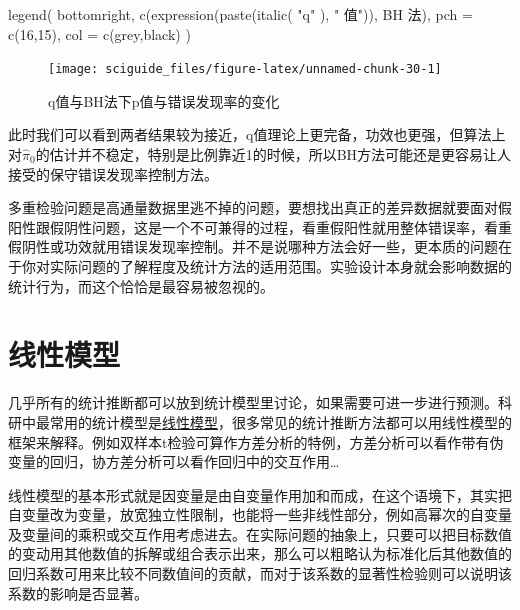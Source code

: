 \documentclass[]{tufte-book}
\newenvironment{Shaded}{}{}
\newcommand{\AttributeTok}[1]{\textcolor[rgb]{0.49,0.56,0.16}{#1}}
\newcommand{\DecValTok}[1]{\textcolor[rgb]{0.25,0.63,0.44}{#1}}
\newcommand{\FunctionTok}[1]{\textcolor[rgb]{0.02,0.16,0.49}{#1}}
\newcommand{\NormalTok}[1]{#1}
\newcommand{\StringTok}[1]{\textcolor[rgb]{0.25,0.44,0.63}{#1}}
\begin{document}
\begin{Shaded}
\begin{Highlighting}[]
\FunctionTok{legend}\NormalTok{(}
  \StringTok{\textquotesingle{}bottomright\textquotesingle{}}\NormalTok{,}
  \FunctionTok{c}\NormalTok{(}\FunctionTok{expression}\NormalTok{(}\FunctionTok{paste}\NormalTok{(}\FunctionTok{italic}\NormalTok{(}
    \StringTok{"q"}
\NormalTok{  ), }\StringTok{" 值"}\NormalTok{)), }\StringTok{\textquotesingle{}BH 法\textquotesingle{}}\NormalTok{),}
  \AttributeTok{pch =} \FunctionTok{c}\NormalTok{(}\DecValTok{16}\NormalTok{,}\DecValTok{15}\NormalTok{),}
  \AttributeTok{col =} \FunctionTok{c}\NormalTok{(}\StringTok{\textquotesingle{}grey\textquotesingle{}}\NormalTok{,}\StringTok{\textquotesingle{}black\textquotesingle{}}\NormalTok{)}
\NormalTok{)}
\end{Highlighting}
\end{Shaded}

\begin{figure}
\texttt{[image: sciguide\_files/figure-latex/unnamed-chunk-30-1]} \caption[q值与BH法下p值与错误发现率的变化]{q值与BH法下p值与错误发现率的变化}\label{fig:unnamed-chunk-30}
\end{figure}

此时我们可以看到两者结果较为接近，q值理论上更完备，功效也更强，但算法上对\(\hat\pi_0\)的估计并不稳定，特别是比例靠近1的时候，所以BH方法可能还是更容易让人接受的保守错误发现率控制方法。

多重检验问题是高通量数据里逃不掉的问题，要想找出真正的差异数据就要面对假阳性跟假阴性问题，这是一个不可兼得的过程，看重假阳性就用整体错误率，看重假阴性或功效就用错误发现率控制。并不是说哪种方法会好一些，更本质的问题在于你对实际问题的了解程度及统计方法的适用范围。实验设计本身就会影响数据的统计行为，而这个恰恰是最容易被忽视的。

\hypertarget{ux7ebfux6027ux6a21ux578b}{%
\section{线性模型}\label{ux7ebfux6027ux6a21ux578b}}

几乎所有的统计推断都可以放到统计模型里讨论，如果需要可进一步进行预测。科研中最常用的统计模型是\href{https://cosx.org/2019/09/common-tests-as-linear-models/}{线性模型}，很多常见的统计推断方法都可以用线性模型的框架来解释。例如双样本t检验可算作方差分析的特例，方差分析可以看作带有伪变量的回归，协方差分析可以看作回归中的交互作用\ldots{}

线性模型的基本形式就是因变量是由自变量作用加和而成，在这个语境下，其实把自变量改为变量，放宽独立性限制，也能将一些非线性部分，例如高幂次的自变量及变量间的乘积或交互作用考虑进去。在实际问题的抽象上，只要可以把目标数值的变动用其他数值的拆解或组合表示出来，那么可以粗略认为标准化后其他数值的回归系数可用来比较不同数值间的贡献，而对于该系数的显著性检验则可以说明该系数的影响是否显著。
\end{document}
